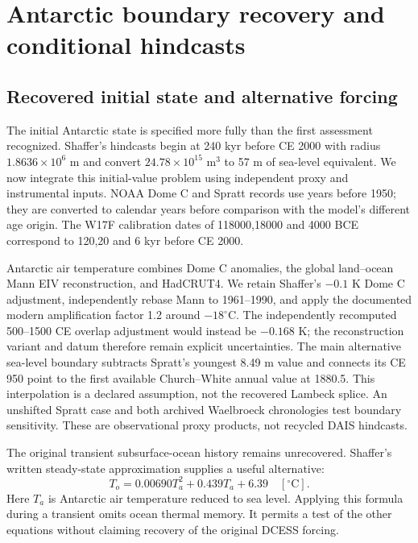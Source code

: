 \section{Antarctic boundary recovery and conditional hindcasts}

\subsection{Recovered initial state and alternative forcing}
The initial Antarctic state is specified more fully than the first assessment
recognized. Shaffer's hindcasts begin at 240 kyr before CE 2000 with radius
$1.8636\times 10^6$ m and convert $24.78\times 10^{15}$ m$^3$ to 57 m of sea-level
equivalent\cite{shaffer}. We now integrate this initial-value problem using
independent proxy and instrumental inputs. NOAA Dome C and Spratt records use
years before 1950; they are converted to calendar years before comparison with
the model's different age origin. The W17F calibration dates of 118000,18000
and 4000 BCE correspond to 120,20 and 6 kyr before CE 2000\cite{wong2017fast}.

Antarctic air temperature combines Dome C anomalies, the global land--ocean
Mann EIV reconstruction, and HadCRUT4. We retain Shaffer's $-0.1$ K Dome C
adjustment, independently rebase Mann to 1961--1990, and apply the documented
modern amplification factor 1.2 around $-18^{\circ}$C. The independently
recomputed 500--1500 CE overlap adjustment would instead be $-0.168$ K;
the reconstruction variant and datum therefore remain explicit uncertainties.
The main alternative sea-level boundary subtracts Spratt's youngest 8.49 m
value and connects its CE 950 point to the first available Church--White annual
value at 1880.5. This interpolation is a declared assumption, not the recovered
Lambeck splice. An unshifted Spratt case and both archived Waelbroeck
chronologies test boundary sensitivity. These are observational proxy products,
not recycled DAIS hindcasts\cite{jouzel2007,spratt2016,mann2008,churchwhite2011,waelbroeck2002}.

The original transient subsurface-ocean history remains unrecovered. Shaffer's
written steady-state approximation supplies a useful alternative:
\begin{equation}
 T_o=0.00690T_a^2+0.439T_a+6.39\quad[^{\circ}\mathrm C].
\end{equation}
Here $T_a$ is Antarctic air temperature reduced to sea level. Applying this
formula during a transient omits ocean thermal memory. It permits a test of
the other equations without claiming recovery of the original DCESS forcing.

